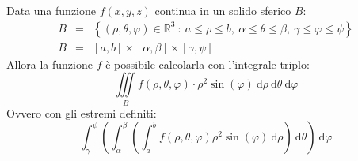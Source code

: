\documentclass[a4paper]{article}
\begin{document}
	\begin{boxdef}
		Data una funzione $f\left(x,y,z\right)$ continua in un solido sferico $B$:
		\begin{equation}
			\begin{array}{rcl}
				B &=& \left\{\left(\rho,\theta,\varphi\right) \in \mathbb{R}^{3} \: : \: a \le \rho \le b,\: \alpha \le \theta \le \beta, \: \gamma \le \varphi \le \psi\right\} \\ [.5em]
				B &=& \left[a, b\right] \times \left[\alpha, \beta\right] \times \left[\gamma, \psi\right]
			\end{array}
		\end{equation}
		Allora la funzione $f$ è possibile calcolarla con l'integrale triplo:
		\begin{equation}
			\displaystyle\iiint\limits_{B} f\left(\rho, \theta, \varphi\right) \cdot \rho^{2} \sin\left(\varphi\right) \:\mathrm{d}\rho\:\mathrm{d}\theta\:\mathrm{d}\varphi
		\end{equation}
		Ovvero con gli estremi definiti:
		\begin{equation}\label{eq: integrale triplo - formula delle coordinate sferiche}
			\displaystyle\int_{\gamma}^{\psi} \left(\int_{\alpha}^{\beta} \left(\int_{a}^{b} f\left(\rho, \theta, \varphi\right) \rho^{2} \sin\left(\varphi\right) \:\mathrm{d}\rho\right) \:\mathrm{d}\theta\right) \:\mathrm{d}\varphi
		\end{equation}
	\end{boxdef}\newpage
\end{document}
